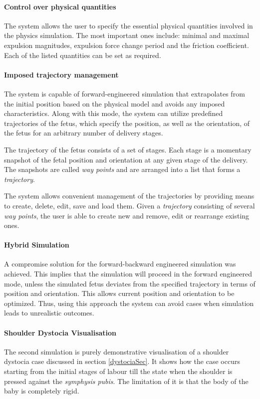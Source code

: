 \paragraph{Control over physical quantities}
The system allows the user to specify the essential physical quantities involved in the physics simulation. The most important ones include: minimal and maximal expulsion magnitudes, expulsion force change period and the friction coefficient. Each of the listed quantities can be set as required.

\paragraph{Imposed trajectory management}
The system is capable of forward-engineered simulation that extrapolates from the initial position based on the physical model and avoids any imposed characteristics. Along with this mode, the system can utilize predefined trajectories of the fetus, which specify the position, as well as the orientation, of the fetus for an arbitrary number of delivery stages.

The trajectory of the fetus consists of a set of stages. Each stage is a momentary snapshot of the fetal position and orientation at any given stage of the delivery. The snapshots are called \emph{way points} and are arranged into a list that forms a \emph{trajectory}.

The system allows convenient management of the trajectories by providing means to create, delete, edit, save and load them. Given a \emph{trajectory} consisting of several \emph{way points}, the user is able to create new and  remove, edit or rearrange existing ones.

\paragraph{Hybrid Simulation}
A compromise solution for the forward-backward engineered simulation was achieved. This implies that the simulation will proceed in the forward engineered mode, unless the simulated fetus deviates from the specified trajectory in terms of position and orientation. This allows current position and orientation to be optimized. Thus, using this approach the system can avoid cases when simulation leads to unrealistic outcomes.

\paragraph{Shoulder Dystocia Visualisation}
The second simulation is purely demonstrative visualisation of a shoulder dystocia case discussed in section \ref{dystociaSec}. It shows how the case occurs starting from the initial stages of labour till the state when the shoulder is pressed against the \emph{symphysis pubis}. The limitation of it is that the body of the baby is completely rigid.

